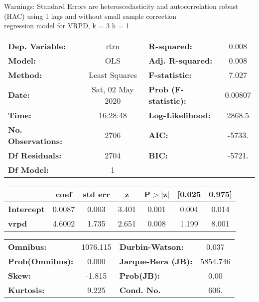 Warnings: \newline
 [1] Standard Errors are heteroscedasticity and autocorrelation robust (HAC) using 1 lags and without small sample correction\\ 

regression model for VRPD, k = 3 h = 1\begin{center}
\begin{tabular}{lclc}
\toprule
\textbf{Dep. Variable:}    &       rtrn       & \textbf{  R-squared:         } &     0.008   \\
\textbf{Model:}            &       OLS        & \textbf{  Adj. R-squared:    } &     0.008   \\
\textbf{Method:}           &  Least Squares   & \textbf{  F-statistic:       } &     7.027   \\
\textbf{Date:}             & Sat, 02 May 2020 & \textbf{  Prob (F-statistic):} &  0.00807    \\
\textbf{Time:}             &     16:28:48     & \textbf{  Log-Likelihood:    } &    2868.5   \\
\textbf{No. Observations:} &        2706      & \textbf{  AIC:               } &    -5733.   \\
\textbf{Df Residuals:}     &        2704      & \textbf{  BIC:               } &    -5721.   \\
\textbf{Df Model:}         &           1      & \textbf{                     } &             \\
\bottomrule
\end{tabular}
\begin{tabular}{lcccccc}
                   & \textbf{coef} & \textbf{std err} & \textbf{z} & \textbf{P$> |$z$|$} & \textbf{[0.025} & \textbf{0.975]}  \\
\midrule
\textbf{Intercept} &       0.0087  &        0.003     &     3.401  &         0.001        &        0.004    &        0.014     \\
\textbf{vrpd}      &       4.6002  &        1.735     &     2.651  &         0.008        &        1.199    &        8.001     \\
\bottomrule
\end{tabular}
\begin{tabular}{lclc}
\textbf{Omnibus:}       & 1076.115 & \textbf{  Durbin-Watson:     } &    0.037  \\
\textbf{Prob(Omnibus):} &   0.000  & \textbf{  Jarque-Bera (JB):  } & 5854.746  \\
\textbf{Skew:}          &  -1.815  & \textbf{  Prob(JB):          } &     0.00  \\
\textbf{Kurtosis:}      &   9.225  & \textbf{  Cond. No.          } &     606.  \\
\bottomrule
\end{tabular}
\end{center}

